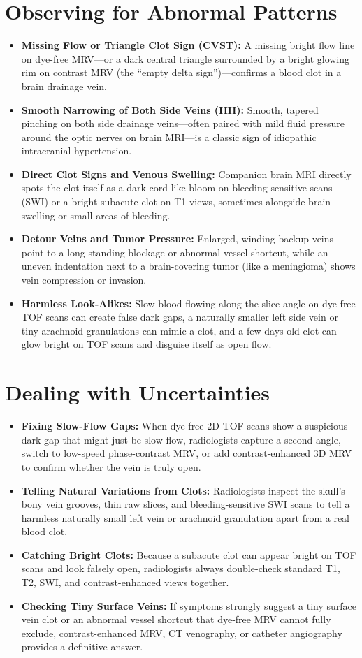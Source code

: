 \section{Observing for Abnormal Patterns}
\begin{itemize}
\item \textbf{Missing Flow or Triangle Clot Sign (CVST):} A missing bright flow line on dye-free MRV---or a dark central triangle surrounded by a bright glowing rim on contrast MRV (the ``empty delta sign'')---confirms a blood clot in a brain drainage vein.
\item \textbf{Smooth Narrowing of Both Side Veins (IIH):} Smooth, tapered pinching on both side drainage veins---often paired with mild fluid pressure around the optic nerves on brain MRI---is a classic sign of idiopathic intracranial hypertension.
\item \textbf{Direct Clot Signs and Venous Swelling:} Companion brain MRI directly spots the clot itself as a dark cord-like bloom on bleeding-sensitive scans (SWI) or a bright subacute clot on T1 views, sometimes alongside brain swelling or small areas of bleeding.
\item \textbf{Detour Veins and Tumor Pressure:} Enlarged, winding backup veins point to a long-standing blockage or abnormal vessel shortcut, while an uneven indentation next to a brain-covering tumor (like a meningioma) shows vein compression or invasion.
\item \textbf{Harmless Look-Alikes:} Slow blood flowing along the slice angle on dye-free TOF scans can create false dark gaps, a naturally smaller left side vein or tiny arachnoid granulations can mimic a clot, and a few-days-old clot can glow bright on TOF scans and disguise itself as open flow.
\end{itemize}

\section{Dealing with Uncertainties}
\begin{itemize}
\item \textbf{Fixing Slow-Flow Gaps:} When dye-free 2D TOF scans show a suspicious dark gap that might just be slow flow, radiologists capture a second angle, switch to low-speed phase-contrast MRV, or add contrast-enhanced 3D MRV to confirm whether the vein is truly open.
\item \textbf{Telling Natural Variations from Clots:} Radiologists inspect the skull's bony vein grooves, thin raw slices, and bleeding-sensitive SWI scans to tell a harmless naturally small left vein or arachnoid granulation apart from a real blood clot.
\item \textbf{Catching Bright Clots:} Because a subacute clot can appear bright on TOF scans and look falsely open, radiologists always double-check standard T1, T2, SWI, and contrast-enhanced views together.
\item \textbf{Checking Tiny Surface Veins:} If symptoms strongly suggest a tiny surface vein clot or an abnormal vessel shortcut that dye-free MRV cannot fully exclude, contrast-enhanced MRV, CT venography, or catheter angiography provides a definitive answer.
\end{itemize}


